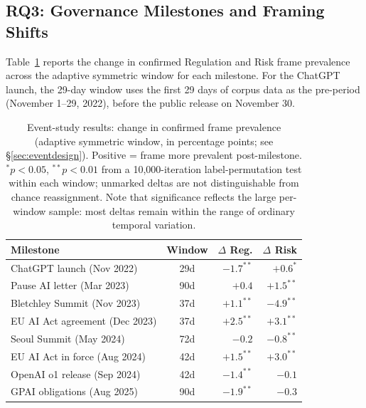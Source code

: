 \documentclass[sigconf]{acmart}
\begin{document}
\subsection{RQ3: Governance Milestones and Framing Shifts}
\label{sec:rq3}

Table~\ref{tab:eventstudy} reports the change in confirmed Regulation and Risk frame prevalence across the adaptive symmetric window for each milestone.
For the ChatGPT launch, the 29-day window uses the first 29 days of corpus data as the pre-period (November 1--29, 2022), before the public release on November 30.

\begin{table}[!t]
\caption{Event-study results: change in confirmed frame prevalence (adaptive symmetric window, in percentage points; see \S\ref{sec:eventdesign}). Positive = frame more prevalent post-milestone. $^{*}p<0.05$, $^{**}p<0.01$ from a 10{,}000-iteration label-permutation test within each window; unmarked deltas are not distinguishable from chance reassignment. Note that significance reflects the large per-window sample: most deltas remain within the range of ordinary temporal variation.}
\label{tab:eventstudy}
\footnotesize
\setlength{\tabcolsep}{3pt}
\begin{tabular}{lcrr}
\toprule
\textbf{Milestone} & \textbf{Window} & \textbf{$\Delta$ Reg.} & \textbf{$\Delta$ Risk} \\
\midrule
ChatGPT launch (Nov 2022)        & 29d  & $-1.7^{**}$ & $+0.6^{*}$ \\
Pause AI letter (Mar 2023)       & 90d  & $+0.4$ & $+1.5^{**}$ \\
Bletchley Summit (Nov 2023)      & 37d  & $+1.1^{**}$ & $-4.9^{**}$ \\
EU AI Act agreement (Dec 2023)   & 37d  & $+2.5^{**}$ & $+3.1^{**}$ \\
Seoul Summit (May 2024)          & 72d  & $-0.2$ & $-0.8^{**}$ \\
EU AI Act in force (Aug 2024)    & 42d  & $+1.5^{**}$ & $+3.0^{**}$ \\
OpenAI o1 release (Sep 2024)     & 42d  & $-1.4^{**}$ & $-0.1$ \\
GPAI obligations (Aug 2025)      & 90d  & $-1.9^{**}$ & $-0.3$ \\
\bottomrule
\end{tabular}
\end{table}
\end{document}
